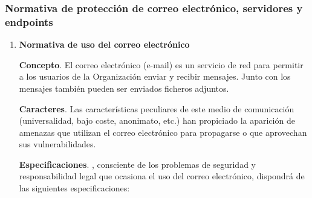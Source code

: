 
\subsubsection{Normativa de protección de correo electrónico, servidores y endpoints}

\begin{enumerate}[label=\alph*)]

\item \textbf{Normativa de uso del correo electrónico}

\textbf{Concepto}. El correo electrónico (e-mail) es un servicio de red para permitir a los usuarios de la Organización enviar y recibir mensajes. Junto con los mensajes también pueden ser enviados ficheros adjuntos.

\textbf{Caracteres}. Las características peculiares de este medio de comunicación (universalidad, bajo coste, anonimato, etc.) han propiciado la aparición de amenazas que utilizan el correo electrónico para propagarse o que aprovechan sus vulnerabilidades.

\textbf{Especificaciones}. \Beneficiario{}, consciente de los problemas de seguridad y responsabilidad legal que ocasiona el uso del correo electrónico, dispondrá de las siguientes especificaciones:


\end{enumerate}
